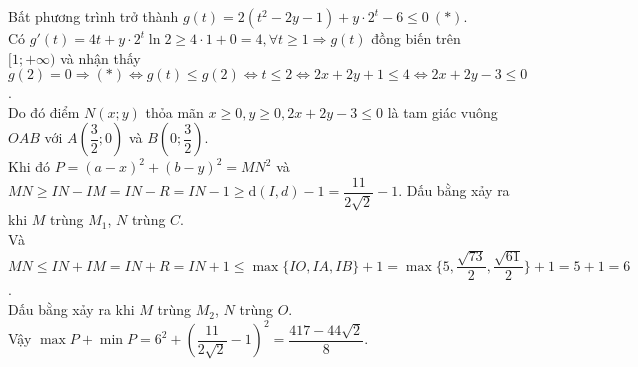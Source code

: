 \begin{ex}
{		Bất phương trình trở thành $g(t)=2(t^2-2y-1)+y\cdot 2^t-6 \leq 0 ~ (*)$.\\
		Có $g'(t)=4t+y\cdot 2^t \ln 2 \geq 4\cdot 1+0=4,\forall t \geq 1 \Rightarrow g(t)$ đồng biến trên $[1;+\infty)$ và nhận thấy\\ $g(2)=0 \Rightarrow (*)\Leftrightarrow g(t)\leq g(2)\Leftrightarrow t\leq 2 \Leftrightarrow 2x+2y+1\leq 4 \Leftrightarrow 2x+2y-3 \leq 0$.\\
		Do đó điểm $N(x;y)$ thỏa mãn $x\geq 0,y\geq 0,2x+2y-3\leq 0$ là tam giác vuông $OAB$ với $A\left(\dfrac{3}{2};0\right)$ và $B\left(0;\dfrac{3}{2}\right)$.\\
		Khi đó $P=(a-x)^2+(b-y)^2=MN^2$ và \\
		$MN\geq IN-IM=IN-R=IN-1\geq \mathrm{d}(I,d)-1=\dfrac{11}{2\sqrt{2}}-1$. Dấu bằng xảy ra khi $M$ trùng $M_1$, $N$ trùng $C$.\\
		Và $MN\leq IN+IM =IN+R=IN+1 \leq \max\{IO,IA,IB\}+1=\max \{5,\dfrac{\sqrt{73}}{2},\dfrac{\sqrt{61}}{2} \}+1=5+1=6$.\\
		Dấu bằng xảy ra khi $M$ trùng $M_2$, $N$ trùng $O$.\\
		Vậy $\max P+\min P=6^2+\left(\dfrac{11}{2\sqrt{2}}-1 \right)^2=\dfrac{417-44\sqrt{2}}{8}$.
	}
\end{ex}

